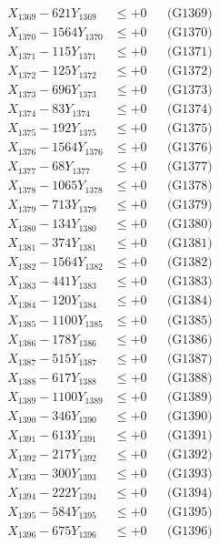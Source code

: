 \documentclass[a4paper,10pt]{article}
\begin{document}
{\begin{align}
X_{1369} - 621Y_{1369} &\leq +0 && \text{(G1369)} \\
X_{1370} - 1564Y_{1370} &\leq +0 && \text{(G1370)} \\
\allowbreak
X_{1371} - 115Y_{1371} &\leq +0 && \text{(G1371)} \\
X_{1372} - 125Y_{1372} &\leq +0 && \text{(G1372)} \\
X_{1373} - 696Y_{1373} &\leq +0 && \text{(G1373)} \\
X_{1374} - 83Y_{1374} &\leq +0 && \text{(G1374)} \\
X_{1375} - 192Y_{1375} &\leq +0 && \text{(G1375)} \\
X_{1376} - 1564Y_{1376} &\leq +0 && \text{(G1376)} \\
X_{1377} - 68Y_{1377} &\leq +0 && \text{(G1377)} \\
X_{1378} - 1065Y_{1378} &\leq +0 && \text{(G1378)} \\
X_{1379} - 713Y_{1379} &\leq +0 && \text{(G1379)} \\
X_{1380} - 134Y_{1380} &\leq +0 && \text{(G1380)} \\
\allowbreak
X_{1381} - 374Y_{1381} &\leq +0 && \text{(G1381)} \\
X_{1382} - 1564Y_{1382} &\leq +0 && \text{(G1382)} \\
X_{1383} - 441Y_{1383} &\leq +0 && \text{(G1383)} \\
X_{1384} - 120Y_{1384} &\leq +0 && \text{(G1384)} \\
X_{1385} - 1100Y_{1385} &\leq +0 && \text{(G1385)} \\
X_{1386} - 178Y_{1386} &\leq +0 && \text{(G1386)} \\
X_{1387} - 515Y_{1387} &\leq +0 && \text{(G1387)} \\
X_{1388} - 617Y_{1388} &\leq +0 && \text{(G1388)} \\
X_{1389} - 1100Y_{1389} &\leq +0 && \text{(G1389)} \\
X_{1390} - 346Y_{1390} &\leq +0 && \text{(G1390)} \\
\allowbreak
X_{1391} - 613Y_{1391} &\leq +0 && \text{(G1391)} \\
X_{1392} - 217Y_{1392} &\leq +0 && \text{(G1392)} \\
X_{1393} - 300Y_{1393} &\leq +0 && \text{(G1393)} \\
X_{1394} - 222Y_{1394} &\leq +0 && \text{(G1394)} \\
X_{1395} - 584Y_{1395} &\leq +0 && \text{(G1395)} \\
X_{1396} - 675Y_{1396} &\leq +0 && \text{(G1396)} \\

\end{align}}
\end{document}

